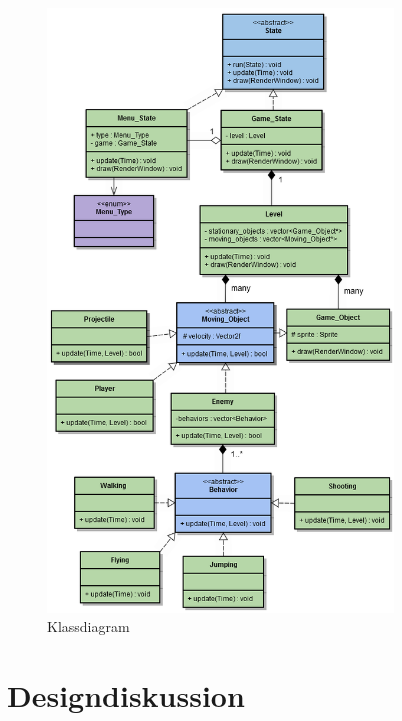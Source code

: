 \documentclass{TDP005mall}
\begin{document}
\begin{figure}[h!]
  \includegraphics[height=16cm]{UML1.2.png}
  \caption{Klassdiagram\label{fig:1}}
\end{figure}

\section{Designdiskussion}

\end{document}
